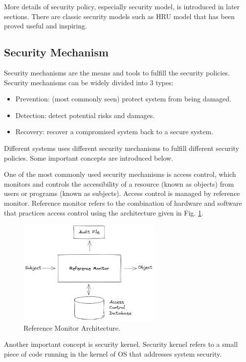 More details of security policy, especially security model, is introduced in later sections. There are classic security models such as HRU model that has been proved useful and inspiring.

\subsection{Security Mechanism}

Security mechanisms are the means and tools to fulfill the security policies. Security mechanisms can be widely divided into 3 types:
\begin{itemize}
  \item Prevention: (most commonly seen) protect system from being damaged.
  \item Detection: detect potential risks and damages.
  \item Recovery: recover a compromised system back to a secure system.
\end{itemize}

Different systems uses different security mechanisms to fulfill different security policies. Some important concepts are introduced below.

One of the most commonly used security mechanisms is access control, which monitors and controls the accessibility of a resource (known as objects) from users or programs (known as subjects). Access control is managed by reference monitor. Reference monitor refers to the combination of hardware and software that practices access control using the architecture given in Fig. \ref{ch:ossec:fig:reference_monitor}.

\begin{figure}[htbp]
	\centering
	\includegraphics[width=200pt]{chapters/ch-computer-security-basics/figures/reference_monitor.png}
	\caption{Reference Monitor Architecture.} \label{ch:ossec:fig:reference_monitor}
\end{figure}

Another important concept is security kernel. Security kernel refers to a small piece of code running in the kernel of OS that addresses system security.

